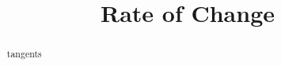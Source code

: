 \documentclass{ximera}
\title{Rate of Change}
\begin{document}
\begin{abstract}
tangents
\end{abstract}
\maketitle
\end{document}
